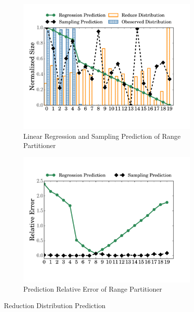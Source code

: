 \begin{figure}
	\begin{subfigure}[b]{0.5\linewidth}
		\includegraphics[width=\linewidth]{fig/range_pre_sample}
		\caption{Linear Regression and Sampling Prediction of Range Partitioner}
		\label{fig:range_pre_sample}
	\end{subfigure}
	\begin{subfigure}[b]{0.49\linewidth}
		\includegraphics[width=\linewidth]{fig/prediction_relative_error}
		\caption{Prediction Relative Error of Range Partitioner\newline}
		\label{fig:prediction_relative_error}
	\end{subfigure}
	\caption{Reduction Distribution Prediction}
	\label{fig:dis}
\end{figure}
